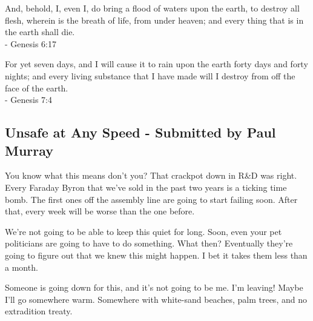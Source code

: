 \documentclass[12pt, a5paper, parskip=half-, footheight=1.4cm]{scrartcl}
\begin{document}
And, behold, I, even I, do bring a flood of waters upon the earth, to destroy all flesh, wherein is the breath of life, from under heaven; and every thing that is in the earth shall die. \\
\vspace{0.5ex}\hspace{8cm} - Genesis 6:17

For yet seven days, and I will cause it to rain upon the earth forty days and forty nights; and every living substance that I have made will I destroy from off the face of the earth.\\
\vspace{0.5ex}\hspace{8cm} - Genesis 7:4

\subsection*{Unsafe at Any Speed \setmainfont{URWClassico} - Submitted by Paul Murray} \label{subsection:unsafe-at-any-speed}
You know what this means don't you?
That crackpot down in R\&D was right. 
Every Faraday Byron that we've sold in the past two years is a ticking time bomb.
The first ones off the assembly line are going to start failing soon.
After that, every week will be worse than the one before.

We're not going to be able to keep this quiet for long.
Soon, even your pet politicians are going to have to do something.
What then?
Eventually they're going to figure out that we knew this might happen.
I bet it takes them less than a month.

Someone is going down for this, and it's not going to be me.
I'm leaving!
Maybe I'll go somewhere warm. 
Somewhere with white-sand beaches, palm trees,  and no extradition treaty.

\newpage
\end{document}
